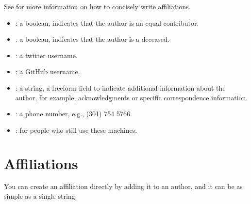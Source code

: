 \documentclass[letterpaper,12pt,english]{sphinxmanual}
\begin{document}
\sphinxAtStartPar
See  for more information on how to concisely write affiliations.
\begin{itemize}
\item {} 
\sphinxAtStartPar
{} : a boolean, indicates that the author is an equal contributor.

\item {} 
\sphinxAtStartPar
{} : a boolean, indicates that the author is a deceased.

\item {} 
\sphinxAtStartPar
{} : a twitter username.

\item {} 
\sphinxAtStartPar
{} : a GitHub username.

\item {} 
\sphinxAtStartPar
{} : a string, a freeform field to indicate additional information about the author, for example, acknowledgments or specific correspondence information.

\item {} 
\sphinxAtStartPar
{} : a phone number, e.g., (301) 754 \sphinxhyphen{} 5766.

\item {} 
\sphinxAtStartPar
{} : for people who still use these machines.

\end{itemize}


\section{Affiliations}
\label{\detokenize{notebooks/02-myst.integration:affiliations}}
\sphinxAtStartPar
You can create an affiliation directly by adding it to an author, and it can be as simple as a single string.

\begin{sphinxVerbatim}[commandchars=\\\{\}]
\end{sphinxVerbatim}
\end{document}
